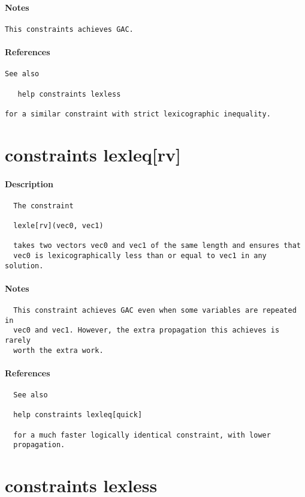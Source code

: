 \paragraph{Notes}
{\footnotesize
\begin{verbatim}
This constraints achieves GAC.
\end{verbatim}
}
\paragraph{References}
{\footnotesize
\begin{verbatim}
See also

   help constraints lexless

for a similar constraint with strict lexicographic inequality.
\end{verbatim}
}
\section{constraints lexleq[rv]}
\paragraph{Description}
{\footnotesize
\begin{verbatim}
  The constraint

  lexle[rv](vec0, vec1)

  takes two vectors vec0 and vec1 of the same length and ensures that
  vec0 is lexicographically less than or equal to vec1 in any solution.
\end{verbatim}
}
\paragraph{Notes}
{\footnotesize
\begin{verbatim}
  This constraint achieves GAC even when some variables are repeated in
  vec0 and vec1. However, the extra propagation this achieves is rarely
  worth the extra work.
\end{verbatim}
}
\paragraph{References}
{\footnotesize
\begin{verbatim}
  See also

  help constraints lexleq[quick]

  for a much faster logically identical constraint, with lower
  propagation.
\end{verbatim}
}
\section{constraints lexless}
